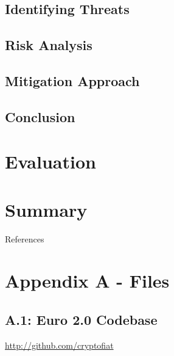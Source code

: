 \documentclass[12pt]{article} %
\begin{document}
{{\subsection{Identifying Threats} \label{ssec:5.3}

\subsection{Risk Analysis} \label{ssec:5.4}

\subsection{Mitigation Approach} \label{ssec:5.5}

\subsection{Conclusion} \label{ssec:5.6}

\pagebreak

\section{Evaluation} \label{sec:6}


\pagebreak

\section{Summary} \label{sec:7}


\pagebreak

 \label{sec:refs}
{References}

\pagebreak

\section*{Appendix A - Files} \label{sec:a}

\subsection*{A.1: Euro 2.0 Codebase} \label{ssec:a.1}
\url{http://github.com/cryptofiat}

}}
\end{document}

